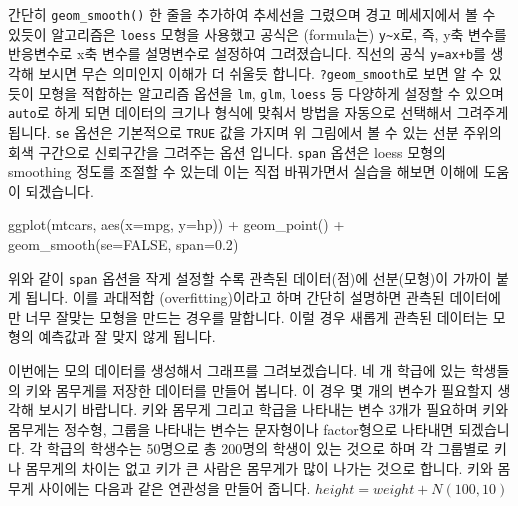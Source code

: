 \documentclass[
]{book}
\newenvironment{Shaded}{\begin{snugshade}}{\end{snugshade}}
\newcommand{\AttributeTok}[1]{\textcolor[rgb]{0.77,0.63,0.00}{#1}}
\newcommand{\ConstantTok}[1]{\textcolor[rgb]{0.00,0.00,0.00}{#1}}
\newcommand{\FloatTok}[1]{\textcolor[rgb]{0.00,0.00,0.81}{#1}}
\newcommand{\FunctionTok}[1]{\textcolor[rgb]{0.00,0.00,0.00}{#1}}
\newcommand{\NormalTok}[1]{#1}
\newcommand{\SpecialCharTok}[1]{\textcolor[rgb]{0.00,0.00,0.00}{#1}}
\begin{document}
간단히 \texttt{geom\_smooth()} 한 줄을 추가하여 추세선을 그렸으며 경고 메세지에서 볼 수 있듯이 알고리즘은 \texttt{loess} 모형을 사용했고 공식은 (formula는) \texttt{y\textasciitilde{}x}로, 즉, y축 변수를 반응변수로 x축 변수를 설명변수로 설정하여 그려졌습니다. 직선의 공식 \texttt{y=ax+b}를 생각해 보시면 무슨 의미인지 이해가 더 쉬울듯 합니다. \texttt{?geom\_smooth}로 보면 알 수 있듯이 모형을 적합하는 알고리즘 옵션을 \texttt{lm}, \texttt{glm}, \texttt{loess} 등 다양하게 설정할 수 있으며 \texttt{auto}로 하게 되면 데이터의 크기나 형식에 맞춰서 방법을 자동으로 선택해서 그려주게 됩니다. \texttt{se} 옵션은 기본적으로 \texttt{TRUE} 값을 가지며 위 그림에서 볼 수 있는 선분 주위의 회색 구간으로 신뢰구간을 그려주는 옵션 입니다. \texttt{span} 옵션은 loess 모형의 smoothing 정도를 조절할 수 있는데 이는 직접 바꿔가면서 실습을 해보면 이해에 도움이 되겠습니다.

\begin{Shaded}
\begin{Highlighting}[]
\FunctionTok{ggplot}\NormalTok{(mtcars, }\FunctionTok{aes}\NormalTok{(}\AttributeTok{x=}\NormalTok{mpg, }\AttributeTok{y=}\NormalTok{hp)) }\SpecialCharTok{+}
  \FunctionTok{geom\_point}\NormalTok{() }\SpecialCharTok{+}
  \FunctionTok{geom\_smooth}\NormalTok{(}\AttributeTok{se=}\ConstantTok{FALSE}\NormalTok{, }\AttributeTok{span=}\FloatTok{0.2}\NormalTok{)}
\end{Highlighting}
\end{Shaded}

위와 같이 \texttt{span} 옵션을 작게 설정할 수록 관측된 데이터(점)에 선분(모형)이 가까이 붙게 됩니다. 이를 과대적합 (overfitting)이라고 하며 간단히 설명하면 관측된 데이터에만 너무 잘맞는 모형을 만드는 경우를 말합니다. 이럴 경우 새롭게 관측된 데이터는 모형의 예측값과 잘 맞지 않게 됩니다.

이번에는 모의 데이터를 생성해서 그래프를 그려보겠습니다. 네 개 학급에 있는 학생들의 키와 몸무게를 저장한 데이터를 만들어 봅니다. 이 경우 몇 개의 변수가 필요할지 생각해 보시기 바랍니다. 키와 몸무게 그리고 학급을 나타내는 변수 3개가 필요하며 키와 몸무게는 정수형, 그룹을 나타내는 변수는 문자형이나 factor형으로 나타내면 되겠습니다. 각 학급의 학생수는 50명으로 총 200명의 학생이 있는 것으로 하며 각 그룹별로 키나 몸무게의 차이는 없고 키가 큰 사람은 몸무게가 많이 나가는 것으로 합니다. 키와 몸무게 사이에는 다음과 같은 연관성을 만들어 줍니다. \(height= weight + N(100, 10)\)
\end{document}
